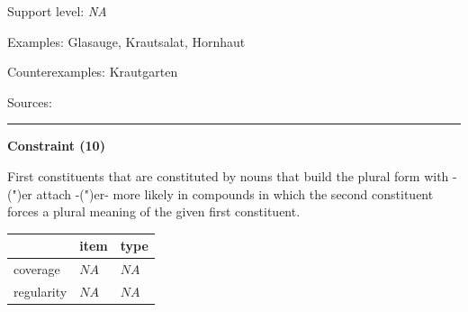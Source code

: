 \vspace{-1.35em}

\noindent
Support level: \textit{NA}

\vspace{0.3em}

\noindent
Examples: Glas{\zeroLinker}auge, Kraut{\zeroLinker}salat, Horn{\zeroLinker}haut

\noindent
Counterexamples: Kraut{\zeroLinker}garten

\vspace{0.3em}

\noindent
Sources: \citet[81]{nuebling_szczepaniak_2013}

\vspace{0.35em}
\hrule




\vspace{0.4em}

\begin{center}
\textbf{Constraint (10)}
\end{center}

\noindent
First constituents that are constituted by nouns that build the plural form with -(")er attach -(")er- more likely in compounds in which the second constituent forces a plural meaning of the given first constituent.
\vspace{0.5em}


\vspace{-0.25em}

\begin{table}[!ht]
\begin{center}
\setlength{\extrarowheight}{1pt}
\begin{tabularx}{\columnwidth}{|X|X|X|}
\hline
 & item & type \\
\hline
 coverage & $NA$ & $NA$ \\
\hline
 regularity & $NA$ & $NA$ \\
\hline
\end{tabularx}
\end{center}
\end{table}

